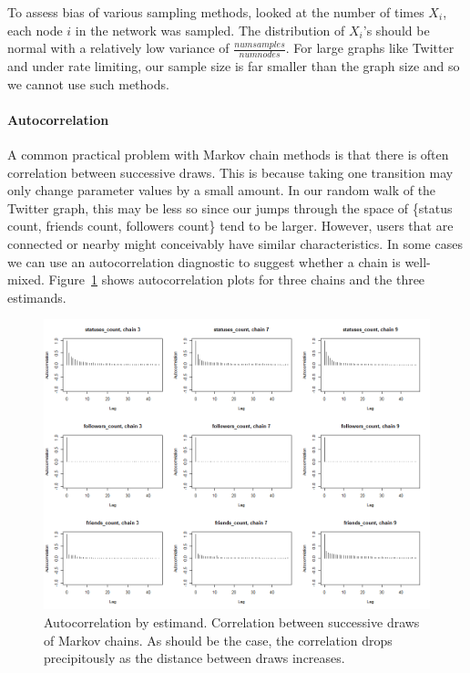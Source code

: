 To assess bias of various sampling methods, \cite{Stutzbach:2006}
looked
at the number of times $X_i$, each node $i$ in the network was sampled. The
distribution of $X_i$'s should be normal with a relatively low variance
of $\frac{num samples}{num nodes}$. For large graphs like Twitter and
under rate limiting, our sample size is far smaller than the graph
size and so we cannot use such methods.

\paragraph{Autocorrelation}

A common practical problem with Markov chain methods is that there is
often correlation between successive draws. This is because taking one
transition may only change parameter values by a small amount. In our
random walk of the Twitter graph, this may be less so since our jumps
through the space of \{status count, friends count, followers count\}
tend to be larger. However, users that are connected or nearby might
conceivably have similar characteristics. In some cases we can use an
autocorrelation diagnostic to suggest whether a chain is well-mixed.
Figure~\ref{fig:autocorr} shows autocorrelation plots for three chains
and the three estimands.

 \begin{figure}[htb]
\begin{center}
    \includegraphics[width=0.8\linewidth]{figs/autocorrelation_chains3-7-9.png}
\end{center}
\caption{Autocorrelation by estimand. Correlation between successive
    draws of Markov chains. As should be the case, the correlation
    drops precipitously as the distance between draws increases.}
\label{fig:autocorr}
\end{figure}

